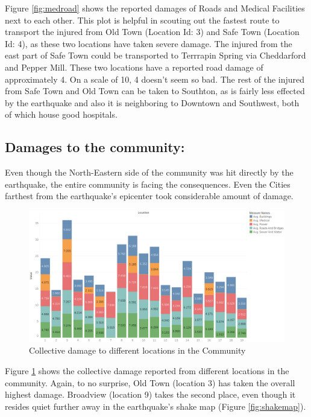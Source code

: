 \documentclass[12pt]{extarticle}
\begin{document}
 Figure \ref{fig:medroad} shows the reported damages of Roads and Medical Facilities next to each other. This plot is helpful in scouting out the fastest route to transport the injured from Old Town (Location Id: 3) and Safe Town (Location Id: 4), as these two locations have taken severe damage.  The injured from the east part of Safe Town could be transported to Terrrapin Spring via Cheddarford and Pepper Mill. These two locations have a reported road damage of approximately 4. On a scale of 10, 4 doesn't seem so bad. The rest of the injured from Safe Town and Old Town can be taken to Southton, as is fairly less effected by the earthquake and also it is neighboring to Downtown and Southwest, both of which house good hospitals.
 
 \subsection{Damages to the community:}
 \label{subsec:damage}
 Even though the North-Eastern side of the community was hit directly by the earthquake, the entire community is facing the consequences. Even the Cities farthest from the earthquake\rq{}s epicenter took considerable amount of damage. 
 
\begin{figure}[H]
\centering
	\includegraphics[height=0.43\linewidth, width=\linewidth]{Images/AllDamage.png}
	\caption{Collective damage to different locations in the Community}
	\label{fig:alldamage}
\end{figure}
 
 Figure \ref{fig:alldamage} shows the collective damage reported from different locations in the community. Again, to no surprise, Old Town (location 3) has taken the overall highest damage. Broadview (location 9) takes the second place, even though it resides quiet further away in the earthquake\rq{}s shake map (Figure \ref{fig:shakemap}). 
\end{document}
